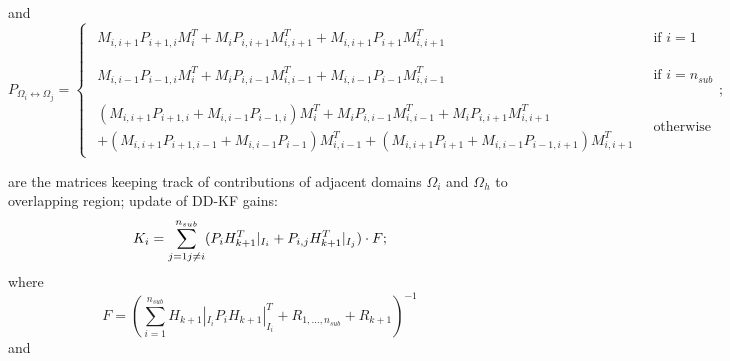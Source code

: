 \documentclass[smallcondensed]{svjour3}
\begin{document}
and 
\begin{equation*}
 P_{\Omega_i \leftrightarrow \Omega_j}=\left\{\begin{array}{ll}
 \begin{array}{ll}
 M_{i,i+1}P_{i+1,i}M_{i}^T +  M_{i}P_{i,i+1}M_{i,i+1}^{T} +M_{i,i+1}P_{i+1}M_{i,i+1}^{T}\end{array} & \ \textrm{if $i=1$}\\
 \\
  \begin{array}{ll}
M_{i,i-1}P_{i-1,i}M_{i}^T + M_{i}P_{i,i-1}M_{i,i-1}^{T}+  M_{i,i-1}P_{i-1}M_{i,i-1}^{T} \end{array}& \ \textrm{if $i=n_{sub}$}\\
 \\
  \begin{array}{ll}
 (M_{i,i+1}P_{i+1,i}+M_{i,i-1}P_{i-1,i})M_{i}^T + M_{i}P_{i,i-1}M_{i,i-1}^{T}+ M_{i}P_{i,i+1}M_{i,i+1}^{T}\\ +(M_{i,i+1}P_{i+1,i-1}+M_{i,i-1}P_{i-1})M_{i,i-1}^{T}+(M_{i,i+1}P_{i+1}+M_{i,i-1}P_{i-1,i+1})M_{i,i+1}^{T} \end{array} & \ \textrm{otherwise}
 
 \end{array}\right.;
\end{equation*}

\noindent are the  matrices keeping track of contributions of  adjacent domains $\Omega_i$ and $\Omega_h$ to  overlapping region;  \noindent update of DD-KF gains:
\begin{equation*}
    K_i=\sum_{j=1\\ j\neq i}^{n_{sub}}(P_{i}H_{k+1}^{T}|_{I_{i}}+P_{i,j}H_{k+1}^{T}|_{I_{j}})\cdot F;
\end{equation*}
where 
\begin{equation*}
    F=(\sum_{i=1}^{n_{sub}} H_{k+1}|_{I_i}P_{i}H_{k+1}|_{I_{i}}^T +R_{1,\ldots,n_{sub}}+R_{k+1})^{-1}
\end{equation*}
and
\end{document}
